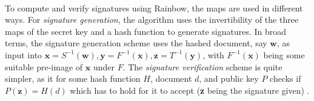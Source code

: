 \medskip\\
To compute and verify signatures using Rainbow, the maps are used in different ways.
For \textit{signature generation}, the algorithm uses the invertibility of the three maps of the secret key and a hash function to generate signatures. In broad terms, the signature generation scheme uses the hashed document, say $\mathbf{w}$, as input into $\mathbf{x} = S^{-1}(\mathbf{w}), \mathbf{y} = F^{-1}(\mathbf{x}), \mathbf{z} = T^{-1}(\mathbf{y})$, with $F^{-1}(\mathbf{x})$ being some suitable pre-image of $\mathbf{x}$ under $F$. The \textit{signature verification} scheme is quite simpler, as it for some hash function $H$, document $d$, and public key $P$ checks if $P(\textbf{z}) = H(d)$ which has to hold for it to accept (\textbf{z} being the signature given) \cite{multicrypto}.

